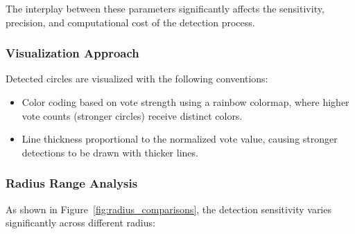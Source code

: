 \documentclass[12pt,a4paper]{article}
\begin{document}
The interplay between these parameters significantly affects the sensitivity, precision, and computational cost of the detection process.


\subsubsection{Visualization Approach}

Detected circles are visualized with the following conventions:

\begin{itemize}
    \item Color coding based on vote strength using a rainbow colormap, where higher vote counts (stronger circles) receive distinct colors.
    \item Line thickness proportional to the normalized vote value, causing stronger detections to be drawn with thicker lines.
\end{itemize}

\subsubsection*{Radius Range Analysis}As shown in Figure~\ref{fig:radius_comparisons}, the detection sensitivity varies significantly across different radius:
\end{document}
